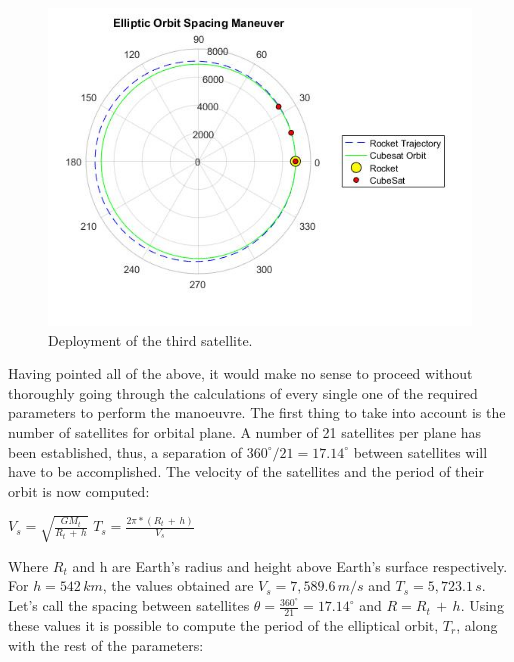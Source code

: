 \begin{figure}[H]
\includegraphics[scale=0.7]{./Sections_CD/S4-First_Placement/Images_S4/Picture_7_S4.jpg}
\caption{Deployment of the third satellite.}
\label{orbit5}
\end{figure}
Having pointed all of the above, it would make no sense to proceed without thoroughly going through the calculations of every single one of the required parameters to perform the manoeuvre. The first thing to take into account is the number of satellites for orbital plane. A number of 21 satellites per plane has been established, thus, a separation of $360^\circ/21 = 17.14^\circ$ between satellites will have to be accomplished. The velocity of the satellites and the period of their orbit is now computed:
\newline
\begin{center}
$V_s = \sqrt{\frac{GM_t}{R_t\,+\,h}} $
\newline\newline
$T_s = \frac{2\pi*(R_t\,+\,h)}{V_s}$\newline
\end{center}
Where $R_t$ and h are Earth's radius and height above Earth's surface respectively. For $h = 542 \,km$, the values obtained are $V_s = 7,589.6 \,m/s$ and $T_s = 5,723.1 \,s$. Let's call the spacing between satellites $\theta = \frac{360^\circ}{21} = 17.14^\circ$ and $R = R_t \,+ \,h$. Using these values it is possible to compute the period of the elliptical orbit, $T_r$, along with the rest of the parameters:
\newline
